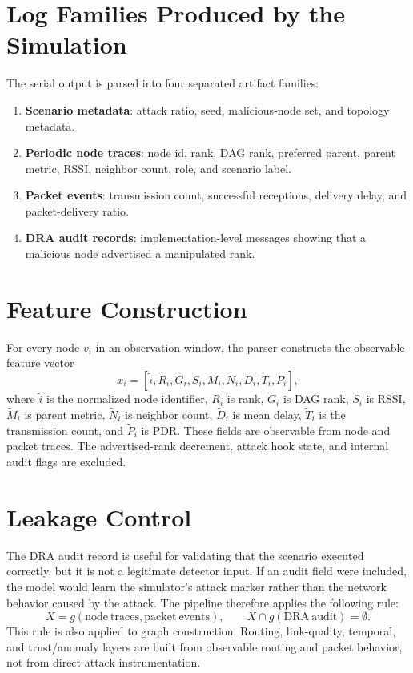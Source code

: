\documentclass[10pt]{article}
\begin{document}
\section{Log Families Produced by the Simulation}
The serial output is parsed into four separated artifact families:
\begin{enumerate}[leftmargin=*]
\item \textbf{Scenario metadata}: attack ratio, seed, malicious-node set, and topology metadata.
\item \textbf{Periodic node traces}: node id, rank, DAG rank, preferred parent, parent metric, RSSI, neighbor count, role, and scenario label.
\item \textbf{Packet events}: transmission count, successful receptions, delivery delay, and packet-delivery ratio.
\item \textbf{DRA audit records}: implementation-level messages showing that a malicious node advertised a manipulated rank.
\end{enumerate}

\section{Feature Construction}
For every node $v_i$ in an observation window, the parser constructs the observable feature vector
\begin{equation}
x_i=
[\tilde{i},\tilde{R}_i,\tilde{G}_i,\tilde{S}_i,
\tilde{M}_i,\tilde{N}_i,\tilde{D}_i,\tilde{T}_i,\tilde{P}_i],
\label{eq:app1_features}
\end{equation}
where $\tilde{i}$ is the normalized node identifier, $\tilde{R}_i$ is rank, $\tilde{G}_i$ is DAG rank, $\tilde{S}_i$ is RSSI, $\tilde{M}_i$ is parent metric, $\tilde{N}_i$ is neighbor count, $\tilde{D}_i$ is mean delay, $\tilde{T}_i$ is the transmission count, and $\tilde{P}_i$ is PDR. These fields are observable from node and packet traces. The advertised-rank decrement, attack hook state, and internal audit flags are excluded.

\section{Leakage Control}
The DRA audit record is useful for validating that the scenario executed correctly, but it is not a legitimate detector input. If an audit field were included, the model would learn the simulator's attack marker rather than the network behavior caused by the attack. The pipeline therefore applies the following rule:
\begin{equation}
X = g(\mathrm{node\ traces},\mathrm{packet\ events}), \qquad
X \cap g(\mathrm{DRA\ audit})=\emptyset.
\label{eq:app1_leakage_rule}
\end{equation}
This rule is also applied to graph construction. Routing, link-quality, temporal, and trust/anomaly layers are built from observable routing and packet behavior, not from direct attack instrumentation.
\end{document}
